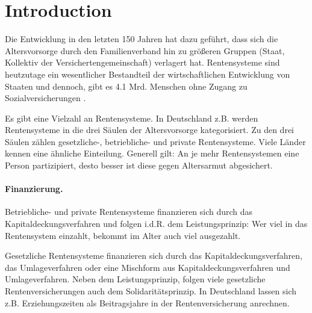 \section{Introduction}


Die Entwicklung in den letzten 150 Jahren hat dazu geführt, dass sich die Altersvorsorge durch den Familienverband hin zu größeren Gruppen (Staat, Kollektiv der Versichertengemeinschaft) verlagert hat. Rentensysteme sind heutzutage ein wesentlicher Bestandteil der wirtschaftlichen Entwicklung von Staaten und dennoch, gibt es 4.1 Mrd. Menschen ohne Zugang zu Sozialversicherungen \cite{noauthor_universal_2017}.

Es gibt eine Vielzahl an Rentensysteme. In Deutschland z.B. werden Rentensysteme in die drei Säulen der Altersvorsorge kategorisiert. Zu den drei Säulen zählen gesetzliche-, betriebliche- und private Rentensysteme. Viele Länder kennen eine ähnliche Einteilung. Generell gilt: An je mehr Rentensystemen eine Person partizipiert, desto besser ist diese gegen Altersarmut abgesichert.

\paragraph{Finanzierung.} Betriebliche- und private Rentensysteme finanzieren sich durch das Kapitaldeckungsverfahren und folgen i.d.R. dem Leistungsprinzip: Wer viel in das Rentensystem einzahlt, bekommt im Alter auch viel ausgezahlt.

Gesetzliche Rentensysteme finanzieren sich durch das Kapitaldeckungsverfahren, das Umlageverfahren oder eine Mischform aus Kapitaldeckungsverfahren und Umlageverfahren. Neben dem Leistungsprinzip, folgen viele gesetzliche Rentenversicherungen auch dem Solidaritätsprinzip. In Deutschland lassen sich z.B. Erziehungszeiten als Beitragsjahre in der Rentenversicherung anrechnen.

